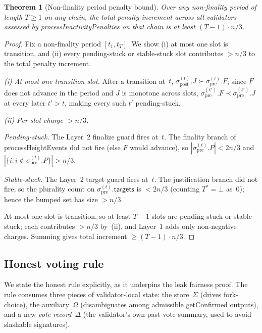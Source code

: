 \ifx\litemode\undefined\documentclass{article}\fi
\newcommand{\targets}{\mathsf{targets}}
\newcommand{\processHeightEvents}{\textsf{processHeightEvents}\xspace}
\newcommand{\processInactivityPenalties}{\textsf{processInactivityPenalties}\xspace}
\newcommand{\getConfirmed}{\textsf{getConfirmed}\xspace}
\theoremstyle{plain}
\newtheorem{theorem}{Theorem}
\theoremstyle{definition}
\theoremstyle{remark}
\begin{document}
\begin{theorem}[Non-finality period penalty bound]\label{thm:tightness}
Over any non-finality period of length $T \geq 1$ on any chain, the total penalty increment across all validators assessed by \processInactivityPenalties on that chain is at least $(T - 1) \cdot n/3$.
\end{theorem}

\begin{proof}
Fix a non-finality period $[t_1, t_T]$.
We show (i) at most one slot is transition, and (ii) every pending-stuck or stable-stuck slot contributes $> n/3$ to the total penalty increment.

\emph{(i) At most one transition slot.}
After a transition at~$t$, $\sigma_{\mathrm{post}}^{(t)}.J \succ \sigma_{\mathrm{pre}}^{(t)}.F$; since $F$ does not advance in the period and $J$ is monotone across slots, $\sigma_{\mathrm{pre}}^{(t')}.F \prec \sigma_{\mathrm{pre}}^{(t')}.J$ at every later $t' > t$, making every such $t'$ pending-stuck.

\emph{(ii) Per-slot charge $> n/3$.}

\emph{Pending-stuck.} The Layer~2 finalize guard fires at~$t$.
The finality branch of \processHeightEvents did not fire (else $F$ would advance), so $|\sigma_{\mathrm{pre}}^{(t)}.P| < 2n/3$ and $|\{i : i \notin \sigma_{\mathrm{pre}}^{(t)}.P\}| > n/3$.

\emph{Stable-stuck.} The Layer~2 target guard fires at~$t$.
The justification branch did not fire, so the plurality count on $\sigma_{\mathrm{pre}}^{(t)}.\targets$ is $< 2n/3$ (counting $T^* = \bot$ as~$0$); hence the bumped set has size $> n/3$.

At most one slot is transition, so at least $T - 1$ slots are pending-stuck or stable-stuck; each contributes $> n/3$ by~(ii), and Layer~1 adds only non-negative charges.
Summing gives total increment $\geq (T-1) \cdot n/3$.
\end{proof}

\subsection{Honest voting rule}

We state the honest rule explicitly, as it underpins the leak fairness proof.
The rule consumes three pieces of validator-local state: the store~$\Sigma$ (drives fork-choice), the auxiliary~$\Omega$ (disambiguates among admissible \getConfirmed outputs), and a new \emph{vote record}~$\Delta$ (the validator's own past-vote summary, used to avoid slashable signatures).
\end{document}
